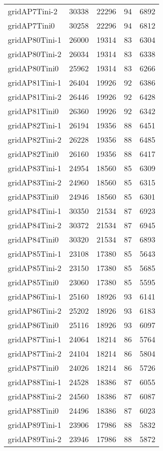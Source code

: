 \begin{tabular}{lrrrr}
gridAP7Tini-2 & 30338 & 22296 & 94 & 6892 \\
gridAP7Tini0 & 30258 & 22296 & 94 & 6812 \\
gridAP80Tini-1 & 26000 & 19314 & 83 & 6304 \\
gridAP80Tini-2 & 26034 & 19314 & 83 & 6338 \\
gridAP80Tini0 & 25962 & 19314 & 83 & 6266 \\
gridAP81Tini-1 & 26404 & 19926 & 92 & 6386 \\
gridAP81Tini-2 & 26446 & 19926 & 92 & 6428 \\
gridAP81Tini0 & 26360 & 19926 & 92 & 6342 \\
gridAP82Tini-1 & 26194 & 19356 & 88 & 6451 \\
gridAP82Tini-2 & 26228 & 19356 & 88 & 6485 \\
gridAP82Tini0 & 26160 & 19356 & 88 & 6417 \\
gridAP83Tini-1 & 24954 & 18560 & 85 & 6309 \\
gridAP83Tini-2 & 24960 & 18560 & 85 & 6315 \\
gridAP83Tini0 & 24946 & 18560 & 85 & 6301 \\
gridAP84Tini-1 & 30350 & 21534 & 87 & 6923 \\
gridAP84Tini-2 & 30372 & 21534 & 87 & 6945 \\
gridAP84Tini0 & 30320 & 21534 & 87 & 6893 \\
gridAP85Tini-1 & 23108 & 17380 & 85 & 5643 \\
gridAP85Tini-2 & 23150 & 17380 & 85 & 5685 \\
gridAP85Tini0 & 23060 & 17380 & 85 & 5595 \\
gridAP86Tini-1 & 25160 & 18926 & 93 & 6141 \\
gridAP86Tini-2 & 25202 & 18926 & 93 & 6183 \\
gridAP86Tini0 & 25116 & 18926 & 93 & 6097 \\
gridAP87Tini-1 & 24064 & 18214 & 86 & 5764 \\
gridAP87Tini-2 & 24104 & 18214 & 86 & 5804 \\
gridAP87Tini0 & 24026 & 18214 & 86 & 5726 \\
gridAP88Tini-1 & 24528 & 18386 & 87 & 6055 \\
gridAP88Tini-2 & 24560 & 18386 & 87 & 6087 \\
gridAP88Tini0 & 24496 & 18386 & 87 & 6023 \\
gridAP89Tini-1 & 23906 & 17986 & 88 & 5832 \\
gridAP89Tini-2 & 23946 & 17986 & 88 & 5872 \\

\end{tabular}
